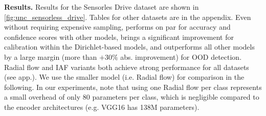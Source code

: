 \begin{table}
    \centering
    \caption{Results on Sensorless Drive dataset. Bold numbers indicate best score among Dirichlet parametrized models and starred numbers indicate best scores among all models.}
    \label{fig:unc_sensorless_drive}
\end{table}

\textbf{Results.} 
Results for the Sensorles Drive dataset are shown in \cref{fig:unc_sensorless_drive}. Tables for other datasets are in the appendix. Even without requiring expensive sampling, \PostNetacro performs on par for accuracy and confidence scores with other models, brings a significant improvement for calibration within the Dirichlet-based models, and outperforms all other models by a large margin (more than $+30\%$ abs. improvement) for OOD detection. Radial flow and IAF variants both achieve strong performance for all datasets (see app.). We use the smaller model (i.e. Radial flow) for comparison in the following. In our experiments, note that using one Radial flow per class represents a small overhead of only $80$ parameters per class, which is negligible compared to the encoder architectures (e.g. VGG16 has 138M parameters).

